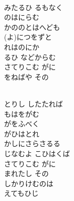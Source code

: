 \documentclass[10pt,b5j]{tarticle} %
\begin{document}
\begin{enumerate}
\begin{minipage}[c]{\blocksize}
    \end{minipage}
    \begin{minipage}[c]{\blocksize}
        
        \vspace{\linespace}
        \item~\\
        みたるひ るもなく\\
        のはにらむ\\
        かののとはへども\\
        (よ)につをずと\\
        れはのにか\\
        るひ などからむ\\
        さてりこむ がに\\
        をねばや その
        
    \end{minipage}
    \begin{minipage}[c]{\blocksize}
        
        \vspace{\linespace}
        \item~\\
        とりし したたれば\\
        もはをがむ\\
        がをふべく\\
        がひはとれ\\
        かしにさらさるる\\
        じなむよ こひはくば\\
        さてりこむ がに\\
        まれたし その\\
        しかりけむのは\\
        えてもひじ
    
    \end{minipage}
\end{enumerate} %
\end{document}
